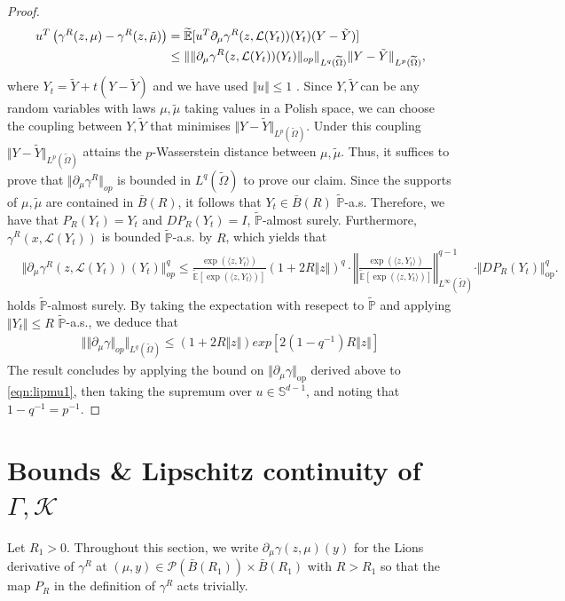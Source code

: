 \documentclass{article}
\begin{document}
\begin{appendices}
\begin{proof}
\begin{align}
u^T\left( \gamma^R(z,\mu)-\gamma^R(z,\tilde{\mu})\right)  &=  \widetilde{\mathbb{E}}[u^T\partial_{\mu}\gamma^R(z,\mathcal{L}(Y_t))(Y_t)(Y-\tilde{Y})]  \\
& \leq \Vert \Vert \partial_{\mu}\gamma^R(z,\mathcal{L}(Y_t))(Y_t)\Vert_{op}\Vert_{L^q(\widetilde \Omega)}\Vert Y-\tilde{Y}\Vert_{L^p(\widetilde \Omega)},\notag
\end{align}
where $Y_t=\tilde{Y} + t(Y-\tilde{Y})$ and we have used $\Vert u\Vert\le 1$ . Since $Y,\tilde{Y}$ can be any random variables with laws $\mu,\tilde{\mu}$ taking values in a Polish space, we can choose the coupling between $Y,\tilde Y $ that minimises $\Vert Y-\tilde{Y}\Vert_{L^p(\widetilde \Omega)}$. Under this coupling $\Vert Y-\tilde{Y}\Vert_{L^p(\widetilde \Omega)}$ attains the $p$-Wasserstein distance between $\mu,\tilde{\mu}$. Thus, it suffices to prove that $\Vert \partial_{\mu}\gamma^R\Vert_{op}$ is bounded in $L^q(\widetilde \Omega)$ to prove our claim. Since the supports of $\mu,\tilde \mu$ are contained in $\bar B(R)$, it follows that $Y_t\in \bar B(R)$ $ \widetilde{\mathbb P}$-a.s. Therefore, we have that $P_R(Y_t)=Y_t$ and $DP_R(Y_t)=I$, $\widetilde{\mathbb P}$-almost surely. Furthermore, $\gamma^R(x,\mathcal L(Y_t))$ is bounded $\widetilde{\mathbb P}$-a.s. by $R$, which  yields that
\begin{align*}
&\Vert\partial_{\mu}\gamma^R(z,\mathcal{L}(Y_t))(Y_t)\Vert^q_{op}\le \frac{\exp(\langle z,Y_t\rangle)}{\widetilde{\mathbb E}[\exp(\langle z,Y_t\rangle)]}(1 + 2R\Vert z\Vert)^q\cdot \left\Vert\frac{\exp(\langle z,Y_t\rangle)}{\widetilde{\mathbb E}[\exp(\langle z,Y_t\rangle)]}\right\Vert_{L^{\infty}(\widetilde \Omega)}^{q-1}\cdot \Vert DP_R(Y_t)\Vert^q_{\mathrm{op}}.
\end{align*}
holds $\widetilde{\mathbb P}$-almost surely. By taking the expectation with resepect to $\widetilde{\mathbb P}$ and applying $\Vert Y_t\Vert \le R$ $\widetilde{\mathbb P}$-a.s., we deduce that
\begin{align*}
\Vert\Vert\partial_{\mu}\gamma\Vert_{op}\Vert_{L^q(\widetilde \Omega)} \le (1+2R\Vert z\Vert)exp\left[2(1-q^{-1})R\Vert z\Vert\right]
\end{align*}
The result concludes by applying the bound on $\Vert\partial_\mu\gamma\Vert_\mathrm{op}$ derived above to \eqref{eqn:lipmu1}, then taking the supremum over $u\in \mathbb S^{d-1}$, and noting that $1-q^{-1}=p^{-1}$. 
\end{proof}
\section{Bounds \& Lipschitz continuity of $\Gamma,\mathcal K$}\label{App:D}
Let $R_1>0$. Throughout this section, we write $\partial_\mu\gamma(z,\mu)(y)$ for the Lions derivative of $\gamma^R$ at $(\mu,y)\in \mathcal P(\bar B(R_1))\times \bar B(R_1)$ with $R>R_1$ so that the map $P_R$ in the definition of $\gamma^R$ acts trivially.


\end{appendices}
\end{document}
